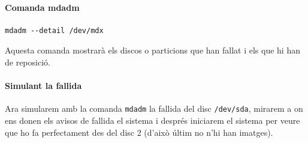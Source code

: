 \documentclass[a4paper]{article}
\begin{document}
\paragraph{Comanda mdadm \\}
\begin{verbatim}
mdadm --detail /dev/mdx
\end{verbatim}
Aquesta comanda mostrarà els discos o particions que han fallat i els que hi han de reposició.
\paragraph{Simulant la fallida \\}
Ara simularem amb la comanda \verb+mdadm+ la fallida del disc \verb+/dev/sda+, mirarem a on ens donen els avisos de fallida el sistema i despr\'es iniciarem el sistema per veure que ho fa perfectament des del disc 2 (d'això últim no n'hi han imatges).\\
 \\
 \\
 \\
 \\
\end{document}
